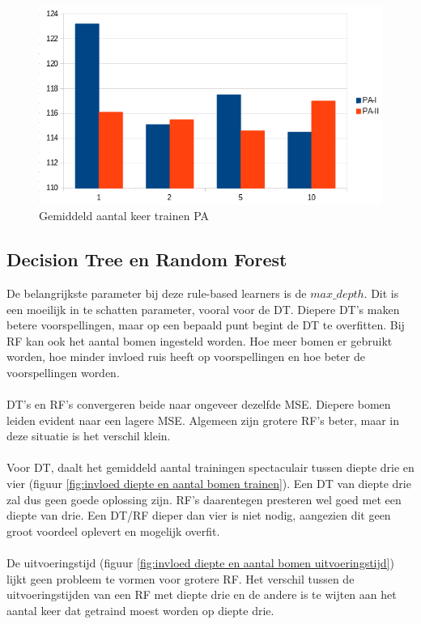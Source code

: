 \newpage
\begin{figure}[t]
	\includegraphics[width=\linewidth]{images/evaluatie/aantalkeertrainenpa.png}
	\caption{Gemiddeld aantal keer trainen PA}
	\label{fig:gemiddeld aantal keer trainen pa}
\end{figure}
\subsection{Decision Tree en Random Forest}
De belangrijkste parameter bij deze rule-based learners is de $max\_ depth$. Dit is een moeilijk in te schatten parameter, vooral voor de DT. Diepere DT’s maken betere voorspellingen, maar op een bepaald punt begint de DT te overfitten. Bij RF kan ook het aantal bomen ingesteld worden. Hoe meer bomen er gebruikt worden, hoe minder invloed ruis heeft op voorspellingen en hoe beter de voorspellingen worden.
\\\\
DT’s en RF’s convergeren beide naar ongeveer dezelfde MSE. Diepere bomen leiden evident naar een lagere MSE. Algemeen zijn grotere RF’s beter, maar in deze situatie is het verschil klein.
\\\\
Voor DT, daalt het gemiddeld aantal trainingen spectaculair tussen diepte drie en vier (figuur \ref{fig:invloed diepte en aantal bomen trainen}). Een DT van diepte drie zal dus geen goede oplossing zijn. RF’s daarentegen presteren wel goed met een diepte van drie. Een DT/RF dieper dan vier is niet nodig, aangezien dit geen groot voordeel oplevert en mogelijk overfit.
\\\\
De uitvoeringstijd (figuur \ref{fig:invloed diepte en aantal bomen uitvoeringstijd}) lijkt geen probleem te vormen voor grotere RF. Het verschil tussen de uitvoeringstijden van een RF met diepte drie en de andere is te wijten aan het aantal keer dat getraind moest worden op diepte drie.

